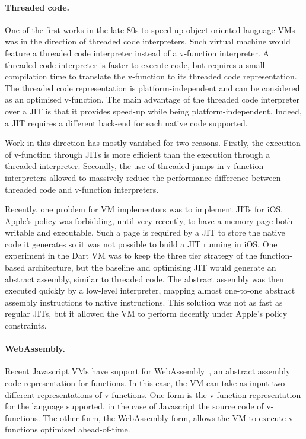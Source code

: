 \documentclass[a4paper,12pt,twoside]{../includes/ThesisStyle}
\begin{document}
\paragraph{Threaded code.}
One of the first works in the late 80s to speed up object-oriented language VMs was in the direction of threaded code interpreters. Such virtual machine would feature a threaded code interpreter instead of a v-function interpreter. A threaded code interpreter is faster to execute code, but requires a small compilation time to translate the v-function to its threaded code representation. The threaded code representation is platform-independent and can be considered as an optimised v-function. The main advantage of the threaded code interpreter over a JIT is that it provides speed-up while being platform-independent. Indeed, a JIT requires a different back-end for each native code supported. 

Work in this direction has mostly vanished for two reasons. Firstly, the execution of v-function through JITs is more efficient than the execution through a threaded interpreter. Secondly, the use of threaded jumps in v-function interpreters allowed to massively reduce the performance difference between threaded code and v-function interpreters.

Recently, one problem for VM implementors was to implement JITs for iOS. Apple's policy was forbidding, until very recently, to have a memory page both writable and executable. Such a page is required by a JIT to store the native code it generates so it was not possible to build a JIT running in iOS. One experiment in the Dart VM was to keep the three tier strategy of the function-based architecture, but the baseline and optimising JIT would generate an abstract assembly, similar to threaded code. The abstract assembly was then executed quickly by a low-level interpreter, mapping almost one-to-one abstract assembly instructions to native instructions. This solution was not as fast as regular JITs, but it allowed the VM to perform decently under Apple's policy constraints.

\paragraph{WebAssembly.}
Recent Javascript VMs have support for WebAssembly~\cite{WebAssembly}, an abstract assembly code representation for functions. In this case, the VM can take as input two different representations of v-functions. One form is the v-function representation for the language supported, in the case of Javascript the source code of v-functions. The other form, the WebAssembly form, allows the VM to execute v-functions optimised ahead-of-time.
\end{document}
